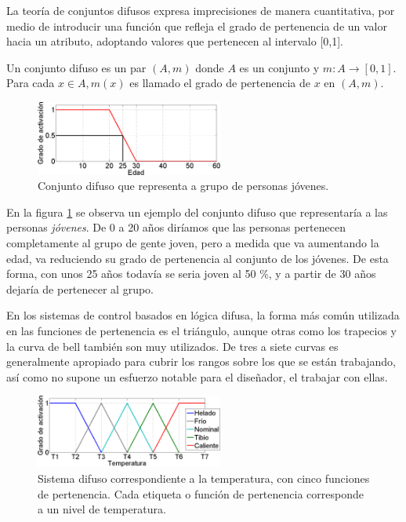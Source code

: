 La teoría de conjuntos difusos expresa imprecisiones de manera cuantitativa, por medio de introducir una función que refleja el grado de pertenencia de un valor hacia un atributo, adoptando valores que pertenecen al intervalo [0,1].

Un conjunto difuso es un par $(A,m)$ donde $A$ es un conjunto y $m : A \longrightarrow [0,1]$.
Para cada $x \in A, m(x)$ es llamado el grado de pertenencia de $x$ en $(A,m)$.

\begin{figure}[htb]
\centering
\includegraphics[width=0.55\textwidth,type=png,ext=.png,read=.png]{figures/conjunto_difuso}
\caption{Conjunto difuso que representa a grupo de personas jóvenes.}
\label{fig:conjunto}
\end{figure} 

En la figura \ref{fig:conjunto} se observa un ejemplo del conjunto difuso que representaría a las personas \textit{jóvenes}. De 0 a 20 años diríamos que las personas pertenecen completamente al grupo de gente joven, pero a medida que va aumentando la edad, va reduciendo su grado de pertenencia al conjunto de los jóvenes. De esta forma, con unos 25 años todavía se seria joven al 50 \%, y a partir de 30 años dejaría de pertenecer al grupo. 

En los sistemas de control basados en lógica difusa, la forma más común utilizada en las funciones de pertenencia es el triángulo, aunque otras como los trapecios y la curva de bell también son muy utilizados. De tres a siete curvas es generalmente apropiado para cubrir los rangos sobre los  que se están trabajando, así como no supone un esfuerzo notable para el diseñador, el trabajar con ellas. 

\begin{figure}[htb]
\centering
\includegraphics[width=0.55\textwidth,type=png,ext=.png,read=.png]{figures/fpertenencia}
\caption{Sistema difuso correspondiente a la temperatura, con cinco funciones de pertenencia. Cada etiqueta o función de pertenencia corresponde a un nivel de temperatura.}
\label{fig:fpertenencia}
\end{figure} 

